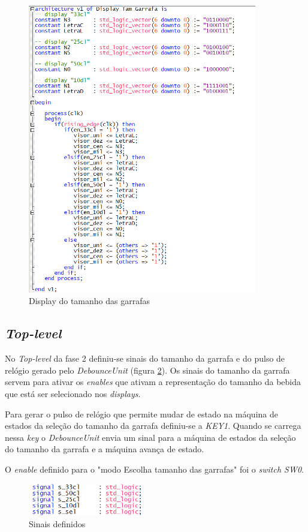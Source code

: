 \documentclass{report}
\begin{document}
\begin{figure}[H]
    \centering
    \includegraphics[width = 10cm]{DisplayFase2.png}
    \caption{Display do tamanho das garrafas}
    \label{fig:DispTAmGA}
\end{figure}
\newpage

\subsection{\textit{Top-level}}

No \textit{Top-level} da fase 2 definiu-se sinais do tamanho da garrafa e do pulso de relógio gerado pelo \textit{DebounceUnit} (figura \ref{fig:signals}). Os sinais do tamanho da garrafa servem para ativar os \textit{enables} que ativam a representação do tamanho da bebida que está ser selecionado nos \textit{displays}.

Para gerar o pulso de relógio que permite mudar de estado na máquina de estados da seleção do tamanho da garrafa definiu-se a \textit{KEY1}. Quando se carrega nessa \textit{key} o \textit{DebounceUnit} envia um sinal para a máquina de estados da seleção do tamanho da garrafa e a máquina avança de estado.

O \textit{enable} definido para o "modo Escolha tamanho das garrafas" foi o \textit{switch SW0}.

\begin{figure}[H]
    \centering
    \includegraphics[width = 5cm]{signalsf2.png}
    \caption{Sinais definidos}
    \label{fig:signals}
\end{figure}
\end{document}
